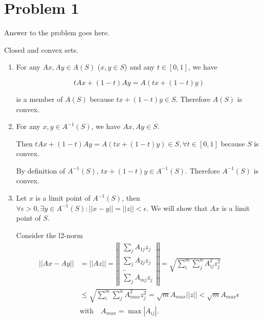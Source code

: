 \documentclass[12pt,letterpaper]{article}
\begin{document}
\section*{Problem 1}

Answer to the problem goes here.

\begin{alphalist}

\item Closed and convex sets.
\begin{enumerate}[label=(\roman*)]
    \item
        For any $Ax, Ay \in A(S)$ ($x, y \in S$) and any $t \in [0, 1]$, we have

        \[t Ax + (1 - t) Ay = A (t x + (1- t)y)\]

        is a member of $A(S)$ because $t x + (1-t) y \in S$.
        Therefore $A(S)$ is convex.

    \item
        For any $x, y \in A^{-1}(S)$, we have $Ax, Ay \in S$.

        Then $t Ax + (1-t)Ay = A(t x + (1-t)y) \in S,
        \forall t \in [0, 1]$ because $S$ is convex.

        By definition of $A^{-1}(S)$, $t x + (1-t)y \in A^{-1}(S)$. Therefore $A^{-1}(S)$ is convex.

    \item
        Let $x$ is a limit point of $A^{-1}(S)$, then $\forall{}\epsilon{}>0,
        \exists{}y \in A^{-1}(S): ||x - y|| = ||z|| < \epsilon$. We will show
        that $Ax$ is a limit point of $S$.

        Consider the l2-norm
        \[
        \begin{split}
            ||Ax - Ay|| &= ||Az||  = \left|\left|\begin{matrix} \sum_j A_{1j}z_j \\ \sum_j A_{2j}z_j \\ .. \\ \sum_j A_{mj}z_j\end{matrix}\right|\right|
                        = \sqrt{\sum_i^m\sum_j^nA_{ij}^2 z_j^2} \\
                        &\le \sqrt{\sum_i^m \sum_j^n A_{max}^2 z_j^2} =\sqrt{m} A_{max} ||z|| < \sqrt{m}A_{max}\epsilon \\
                        &\text{with} \quad A_{max} = \max{|A_{ij}|}.
        \end{split}
    \]


\end{enumerate}
\end{alphalist}
\end{document}
